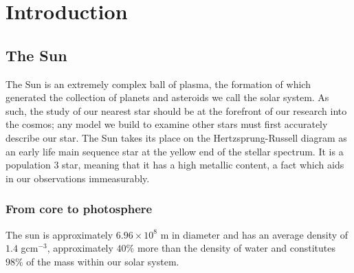 
\newcommand{\pd}[2]{\frac{\partial #1}{\partial #2 }}
\newcommand{\td}[2]{\frac{d #1}{d #2 }}
\newcommand{\mb}[1]{\mathbf{#1}}
\newcommand{\divv}[1]{\bigtriangledown{#1}}
\newcommand{\del}{\bigtriangledown}

\label{ch:Intro}
\chapter{Introduction}  %





\section{The Sun}
The Sun is an extremely complex ball of plasma, the formation of which generated the collection of planets and asteroids we call the solar system.
As such, the study of our nearest star should be at the forefront of our research into the cosmos; any model we build to examine other stars must first accurately describe our star. 
The Sun takes its place on the Hertzsprung-Russell \cite{Hertzsprung1909} \cite{Russell1914} diagram as an early life main sequence star at the yellow end of the stellar spectrum.
It is a population 3 star, meaning that it has a high metallic content, a fact which aids in our observations immeasurably.

\subsection{From core to photosphere}
The sun is approximately $6.96 \times 10^{8}$ m in diameter and has an average density of $1.4$ gcm$^{-3}$, approximately $40\%$ more than the density of water and constitutes $98\%$ of the mass within our solar system.

